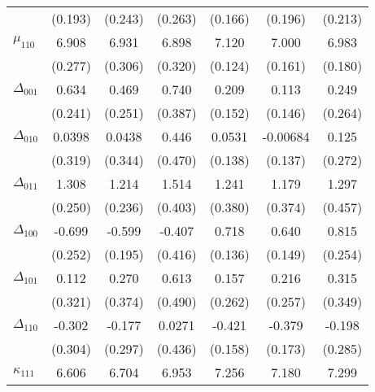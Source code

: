 \begin{tabular}{l*{6}{c}}
          &  (0.193)         &  (0.243)         &  (0.263)         &  (0.166)         &  (0.196)         &  (0.213)         \\
$\mu_{110}$&    6.908\sym{***}&    6.931\sym{***}&    6.898\sym{***}&    7.120\sym{***}&    7.000\sym{***}&    6.983\sym{***}\\
          &  (0.277)         &  (0.306)         &  (0.320)         &  (0.124)         &  (0.161)         &  (0.180)         \\
$\Delta_{001}$&    0.634\sym{***}&    0.469\sym{*}  &    0.740\sym{*}  &    0.209         &    0.113         &    0.249         \\
          &  (0.241)         &  (0.251)         &  (0.387)         &  (0.152)         &  (0.146)         &  (0.264)         \\
$\Delta_{010}$&   0.0398         &   0.0438         &    0.446         &   0.0531         & -0.00684         &    0.125         \\
          &  (0.319)         &  (0.344)         &  (0.470)         &  (0.138)         &  (0.137)         &  (0.272)         \\
$\Delta_{011}$&    1.308\sym{***}&    1.214\sym{***}&    1.514\sym{***}&    1.241\sym{***}&    1.179\sym{***}&    1.297\sym{***}\\
          &  (0.250)         &  (0.236)         &  (0.403)         &  (0.380)         &  (0.374)         &  (0.457)         \\
$\Delta_{100}$&   -0.699\sym{***}&   -0.599\sym{***}&   -0.407         &    0.718\sym{***}&    0.640\sym{***}&    0.815\sym{***}\\
          &  (0.252)         &  (0.195)         &  (0.416)         &  (0.136)         &  (0.149)         &  (0.254)         \\
$\Delta_{101}$&    0.112         &    0.270         &    0.613         &    0.157         &    0.216         &    0.315         \\
          &  (0.321)         &  (0.374)         &  (0.490)         &  (0.262)         &  (0.257)         &  (0.349)         \\
$\Delta_{110}$&   -0.302         &   -0.177         &   0.0271         &   -0.421\sym{***}&   -0.379\sym{**} &   -0.198         \\
          &  (0.304)         &  (0.297)         &  (0.436)         &  (0.158)         &  (0.173)         &  (0.285)         \\
$\kappa_{111}$&    6.606\sym{***}&    6.704\sym{***}&    6.953\sym{***}&    7.256\sym{***}&    7.180\sym{***}&    7.299\sym{***}\\

\end{tabular}
